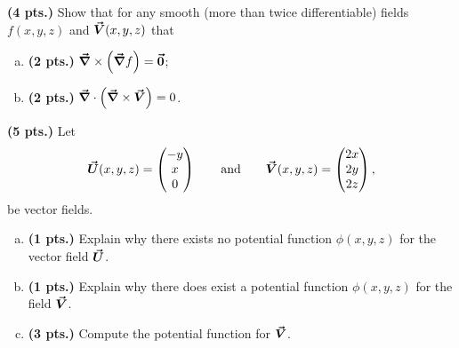 \documentclass[12pt]{article} %
\begin{document}
\vspace*{0.5cm}

\begin{problem}
\textbf{(4 pts.)} Show that for any smooth (more than twice differentiable) fields $f(x,y,z)$ and $\boldsymbol{\vec{V}}(x,y,z)$ that
\begin{enumerate}[(a)]
	\item \textbf{(2 pts.)} $\boldsymbol{\vec{\nabla}} \times \left(\boldsymbol{\vec{\nabla}} f\right)=\boldsymbol{\vec{0}}$;
	\item \textbf{(2 pts.)} $\boldsymbol{\vec{\nabla}} \cdot \left(\boldsymbol{\vec{\nabla}} \times \boldsymbol{\vec{V}}\right)=0$.
\end{enumerate}
\end{problem}

\vspace*{0.5cm}

\begin{problem}
\textbf{(5 pts.)} Let
	\[
	\boldsymbol{\vec{U}}(x,y,z) = \begin{pmatrix} -y \\ x \\ 0 \end{pmatrix} \qquad \textrm{and} \qquad \boldsymbol{\vec{V}}(x,y,z) = \begin{pmatrix} 2x \\ 2y \\ 2z \end{pmatrix},
	\]
	be vector fields.
	\begin{enumerate}[(a)]
		\item \textbf{(1 pts.)} Explain why there exists no potential function $\phi(x,y,z)$ for the vector field $\boldsymbol{\vec{U}}$.
		\item \textbf{(1 pts.)} Explain why there does exist a potential function $\phi(x,y,z)$ for the field $\boldsymbol{\vec{V}}$.
		\item \textbf{(3 pts.)} Compute the potential function for $\boldsymbol{\vec{V}}$.
	\end{enumerate}
\end{problem}

\vspace*{0.5cm}
\end{document}
